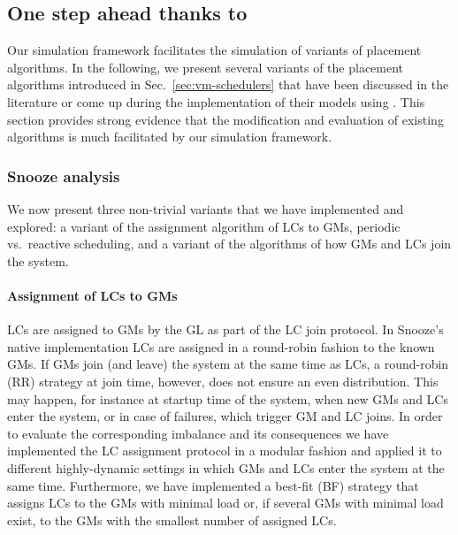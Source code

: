 \subsection{One step ahead thanks to \vmps}

Our simulation framework facilitates the simulation of variants of
placement algorithms. In the following, we present several variants of
the placement algorithms introduced in Sec.~\ref{sec:vm-schedulers}
that have been discussed in the literature or come up during the
implementation of their models using \vmps. This section provides
strong evidence that the modification and evaluation of existing
algorithms is much facilitated by our simulation framework.

\subsubsection{Snooze analysis}
\label{sec:snoozeVariants}

We now present three non-trivial variants that we have implemented and
explored: a variant of the assignment algorithm of LCs to GMs,
periodic vs.\ reactive scheduling, and a variant of the algorithms of
how GMs and LCs join the system.


\paragraph{Assignment of LCs to GMs}

LCs are assigned to GMs by the GL as part of the LC join protocol. In
Snooze's native implementation LCs are assigned in a round-robin
fashion to the known GMs. If GMs join (and leave) the system at the
same time as LCs, a round-robin (RR) strategy at join time, however,
does not ensure an even distribution. This may happen, for instance at
startup time of the system, when new GMs and LCs enter the system, or
in case of failures, which trigger GM and LC joins. In order to
evaluate the corresponding imbalance and its consequences we have
implemented the LC assignment protocol in a modular fashion and
applied it to different highly-dynamic settings in which GMs and LCs
enter the system at the same time. Furthermore, we have implemented a
best-fit (BF) strategy that assigns LCs to the GMs with minimal load
or, if several GMs with minimal load exist, to the GMs with the
smallest number of assigned LCs.




